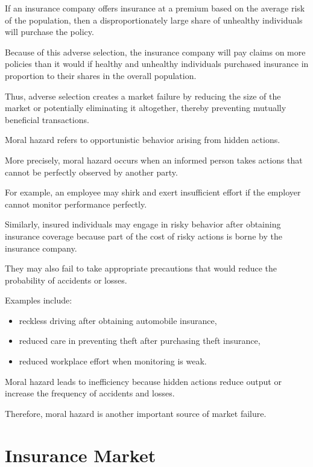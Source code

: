 If an insurance company offers insurance at a premium based on the average risk of the population, then a disproportionately large share of unhealthy individuals will purchase the policy.

Because of this adverse selection, the insurance company will pay claims on more policies than it would if healthy and unhealthy individuals purchased insurance in proportion to their shares in the overall population.

Thus, adverse selection creates a market failure by reducing the size of the market or potentially eliminating it altogether, thereby preventing mutually beneficial transactions.

\bigskip

Moral hazard refers to opportunistic behavior arising from hidden actions.

More precisely, moral hazard occurs when an informed person takes actions that cannot be perfectly observed by another party.

For example, an employee may shirk and exert insufficient effort if the employer cannot monitor performance perfectly.

Similarly, insured individuals may engage in risky behavior after obtaining insurance coverage because part of the cost of risky actions is borne by the insurance company.

They may also fail to take appropriate precautions that would reduce the probability of accidents or losses.

Examples include:

\begin{itemize}
    \item reckless driving after obtaining automobile insurance,
    \item reduced care in preventing theft after purchasing theft insurance,
    \item reduced workplace effort when monitoring is weak.
\end{itemize}

Moral hazard leads to inefficiency because hidden actions reduce output or increase the frequency of accidents and losses.

Therefore, moral hazard is another important source of market failure.

\section{Insurance Market}

